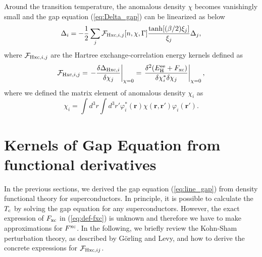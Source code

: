 Around the transition temperature, the anomalous density $\chi$ becomes vanishingly small 
and the gap equation (\ref{eq:Delta_gap}) can be linearized as below
%
\begin{equation}
	\Delta_i = -\frac{1}{2}\sum_{j} {\mathcal F}_{{\rm Hxc}, i,j}[n, \chi, \Gamma]
	\frac{\tanh[(\beta/2)\xi_j]}{\xi_j}\Delta_j,
	\label{eq:line_gap}
\end{equation}
%
where ${\mathcal F}_{{\rm Hxc}, i,j}$ are the Hartree exchange-correlation energy kernels defined as
%
\begin{equation}
	{\mathcal F}_{{\rm Hxc},i,j} = \left. -\frac{\delta \Delta_{{\rm Hxc}, i}}{\delta \chi_j} 
	                               \right|_{\chi = 0}
				       = \left. \frac{\delta^2(E^{\rm ee}_{\rm H}+F_{\rm xc})}
				       {\delta \chi^{\ast}_i \delta \chi_j} \right|_{\chi = 0},
	\label{eq:def-fxc}
\end{equation}
%
where we defined the matrix element of anomalous density $\chi_i$ as
%
\begin{equation}
	\chi_i = \int d^3r\int d^3r' \varphi^{\ast}_i(\bm{r})\chi(\bm{r}, \bm{r'})\varphi_i(\bm{r'}).
	\label{eq:chi_i_def}
\end{equation}
%

\section{Kernels of Gap Equation from functional derivatives}

In the previous sections, we derived the gap equation (\ref{eq:line_gap}) from density functional
theory for superconductors. In principle, it is possible to calculate the $T_{\rm c}$ by solving 
the gap equation for any superconductors. However, the exact expression of $F_{\rm xc}$ in (\ref{eq:def-fxc})
is unknown and therefore we have to make approximations for $F^{\rm xc}$.
In the following, we briefly review the Kohn-Sham perturbation theory,
as described by G\"{o}rling and Levy\cite{Levy1994}, 
and how to derive the concrete expressions for ${\mathcal F}_{{\rm Hxc},ij}$.


